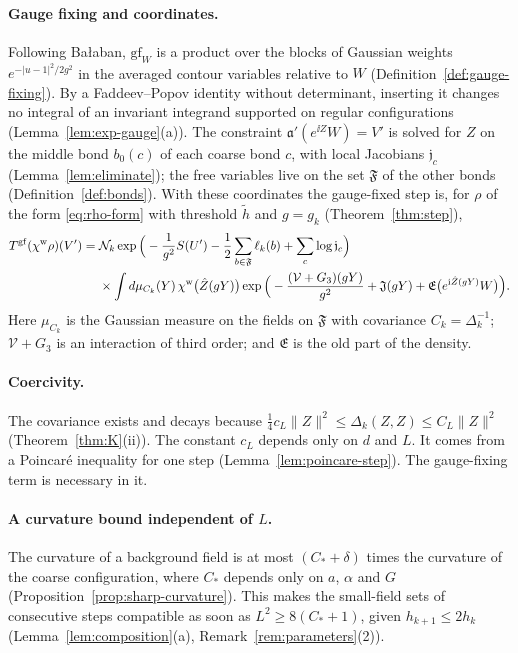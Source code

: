 \paragraph{Gauge fixing and coordinates.} Following Ba\l aban, $\mathrm{gf}_W$ is a product over the blocks of Gaussian weights $e^{-|u-1|^2/2g^2}$ in the averaged contour variables relative to $W$ (Definition~\ref{def:gauge-fixing}). By a Faddeev--Popov identity without determinant, inserting it changes no integral of an invariant integrand supported on regular configurations (Lemma~\ref{lem:exp-gauge}(a)). The constraint $\mathfrak a'(e^{\ii Z}W)=V'$ is solved for $Z$ on the middle bond $b_0(c)$ of each coarse bond $c$, with local Jacobians $\mathfrak j_c$ (Lemma~\ref{lem:eliminate}); the free variables live on the set $\mathfrak F$ of the other bonds (Definition~\ref{def:bonds}). With these coordinates the gauge-fixed step is, for $\rho$ of the form \eqref{eq:rho-form} with threshold $\tilde h$ and $g=g_k$ (Theorem~\ref{thm:step}),
\[
\begin{aligned}
T^{\rm gf}(\chi^{\rm w}\rho)(V')={}&\mathcal N_k\exp\Big(-\frac1{g^2}S(U')-\frac12\sum_{b\in\mathfrak F}\ell_k(b)+\sum_c\log\mathfrak j_c\Big)\\
&\times\int d\mu_{C_k}(Y)\,\chi^{\rm w}\big(\hat Z(gY)\big)\exp\Big(-\frac{(\mathcal V+G_3)(gY)}{g^2}+\mathfrak J(gY)+\mathfrak E\big(e^{\mathrm i\hat Z(gY)}W\big)\Big).
\end{aligned}
\]
Here $\mu_{C_k}$ is the Gaussian measure on the fields on $\mathfrak F$ with covariance $C_k=\Delta_k^{-1}$; $\mathcal V+G_3$ is an interaction of third order; and $\mathfrak E$ is the old part of the density.

\paragraph{Coercivity.} The covariance exists and decays because $\frac14c_L\|Z\|^2\le\Delta_k(Z,Z)\le C_L\|Z\|^2$ (Theorem~\ref{thm:K}(ii)). The constant $c_L$ depends only on $d$ and $L$. It comes from a Poincar\'e inequality for one step (Lemma~\ref{lem:poincare-step}). The gauge-fixing term is necessary in it.

\paragraph{A curvature bound independent of $L$.} The curvature of a background field is at most $(C_*+\delta)$ times the curvature of the coarse configuration, where $C_*$ depends only on $a$, $\alpha$ and $G$ (Proposition~\ref{prop:sharp-curvature}). This makes the small-field sets of consecutive steps compatible as soon as $L^2\ge8(C_*+1)$, given $h_{k+1}\le2h_k$ (Lemma~\ref{lem:composition}(a), Remark~\ref{rem:parameters}(2)).

